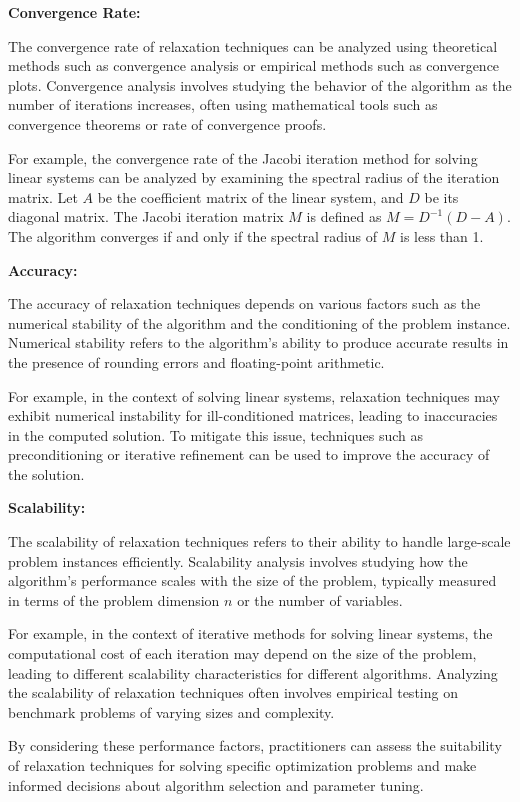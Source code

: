 \documentclass[12pt]{book} %
\begin{document}
\textbf{Convergence Rate:}

The convergence rate of relaxation techniques can be analyzed using theoretical methods such as convergence analysis or empirical methods such as convergence plots. Convergence analysis involves studying the behavior of the algorithm as the number of iterations increases, often using mathematical tools such as convergence theorems or rate of convergence proofs.

For example, the convergence rate of the Jacobi iteration method for solving linear systems can be analyzed by examining the spectral radius of the iteration matrix. Let \(A\) be the coefficient matrix of the linear system, and \(D\) be its diagonal matrix. The Jacobi iteration matrix \(M\) is defined as \(M = D^{-1}(D - A)\). The algorithm converges if and only if the spectral radius of \(M\) is less than 1.

\textbf{Accuracy:}

The accuracy of relaxation techniques depends on various factors such as the numerical stability of the algorithm and the conditioning of the problem instance. Numerical stability refers to the algorithm's ability to produce accurate results in the presence of rounding errors and floating-point arithmetic.

For example, in the context of solving linear systems, relaxation techniques may exhibit numerical instability for ill-conditioned matrices, leading to inaccuracies in the computed solution. To mitigate this issue, techniques such as preconditioning or iterative refinement can be used to improve the accuracy of the solution.

\textbf{Scalability:}

The scalability of relaxation techniques refers to their ability to handle large-scale problem instances efficiently. Scalability analysis involves studying how the algorithm's performance scales with the size of the problem, typically measured in terms of the problem dimension \(n\) or the number of variables.

For example, in the context of iterative methods for solving linear systems, the computational cost of each iteration may depend on the size of the problem, leading to different scalability characteristics for different algorithms. Analyzing the scalability of relaxation techniques often involves empirical testing on benchmark problems of varying sizes and complexity.

By considering these performance factors, practitioners can assess the suitability of relaxation techniques for solving specific optimization problems and make informed decisions about algorithm selection and parameter tuning.
\end{document}
